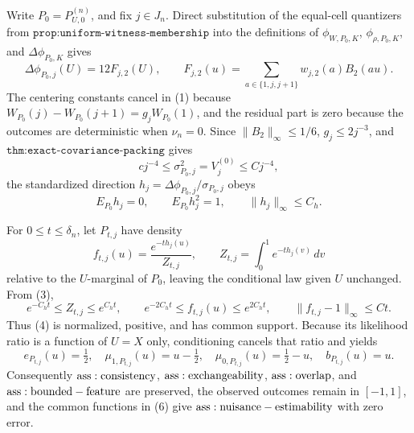 Write \(P_0=P_{U,0}^{(n)}\), and fix \(j\in J_n\).  Direct substitution of the equal-cell quantizers from \(\texttt{prop:uniform-witness-membership}\) into the definitions of \(\phi_{W,P_0,K}\), \(\phi_{\rho,P_0,K}\), and \(\Delta\phi_{P_0,K}\) gives
\[
 \Delta\phi_{P_0,j}(U)=12F_{j,2}(U),\qquad
 F_{j,2}(u)=\sum_{a\in\{1,j,j+1\}}w_{j,2}(a)B_2(au).                                      \tag{1}
\]
The centering constants cancel in (1) because
\(W_{P_0}(j)-W_{P_0}(j+1)=g_jW_{P_0}(1)\), and the residual part is zero because the outcomes are deterministic when \(\nu_n=0\).  Since \(\|B_2\|_\infty\leq1/6\), \(g_j\leq2j^{-3}\), and \(\texttt{thm:exact-covariance-packing}\) gives
\[
 c j^{-4}\leq\sigma_{P_0,j}^2=V_j^{(0)}\leq Cj^{-4},                                      \tag{2}
\]
the standardized direction \(h_j=\Delta\phi_{P_0,j}/\sigma_{P_0,j}\) obeys
\[
 E_{P_0}h_j=0,\qquad E_{P_0}h_j^2=1,\qquad \|h_j\|_\infty\leq C_h.                         \tag{3}
\]

For \(0\leq t\leq\delta_n\), let \(P_{t,j}\) have density
\[
 f_{t,j}(u)=\frac{e^{-t h_j(u)}}{Z_{t,j}},\qquad
 Z_{t,j}=\int_0^1e^{-t h_j(v)}\,dv                                                        \tag{4}
\]
relative to the \(U\)-marginal of \(P_0\), leaving the conditional law given \(U\) unchanged.  From (3),
\[
 e^{-C_ht}\leq Z_{t,j}\leq e^{C_ht},\qquad
 e^{-2C_ht}\leq f_{t,j}(u)\leq e^{2C_ht},\qquad
 \|f_{t,j}-1\|_\infty\leq Ct.                                                           \tag{5}
\]
Thus (4) is normalized, positive, and has common support.  Because its likelihood ratio is a function of \(U=X\) only, conditioning cancels that ratio and yields
\[
 e_{P_{t,j}}(u)=\tfrac12,\quad
 \mu_{1,P_{t,j}}(u)=u-\tfrac12,\quad
 \mu_{0,P_{t,j}}(u)=\tfrac12-u,\quad b_{P_{t,j}}(u)=u.                                   \tag{6}
\]
Consequently \({\rm ass:consistency}\), \({\rm ass:exchangeability}\), \({\rm ass:overlap}\), and \({\rm ass:bounded-feature}\) are preserved, the observed outcomes remain in \([-1,1]\), and the common functions in (6) give \({\rm ass:nuisance-estimability}\) with zero error.

